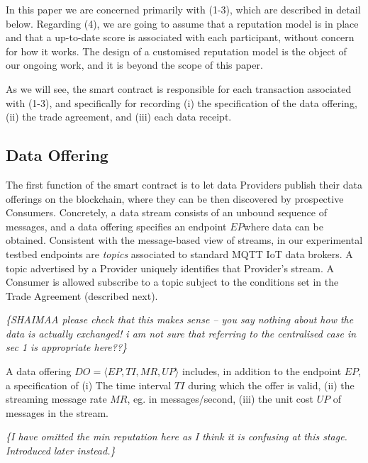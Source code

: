 \documentclass[letterpaper, 10 pt, conference]{ieeeconf}  %
\newcommand{\anote}[1]{{\leavevmode\smaller\itshape\color{red}\{#1\}}}
\newcommand{\ep}{\ensuremath{\mathit{EP}}}
\newcommand{\ti}{\ensuremath{\mathit{TI}}}
\newcommand{\mr}{\ensuremath{\mathit{MR}}}
\newcommand{\up}{\ensuremath{\mathit{UP}}}
\newcommand{\doff}{\ensuremath{\mathit{DO}}}
\begin{document}
In this paper we are concerned primarily with (1-3), which are described in detail below. Regarding (4), we are going to assume that a reputation model is in place and that a up-to-date score is associated with each participant, without concern for how it works. The design of a customised reputation model is the object of our ongoing work, and it is beyond the scope of this paper.

As we will see, the smart contract is responsible for each transaction associated with (1-3), and specifically for recording (i) the specification of the data offering, (ii) the trade agreement, and (iii) each data receipt.

\subsection{Data Offering}

The first function of the smart contract is to let data Providers publish their data offerings on the blockchain, where they can be then discovered by prospective Consumers. 
Concretely, a data stream consists of an unbound sequence of messages, and a data offering specifies an endpoint \ep where data can be obtained. Consistent with the message-based view of streams, in our experimental testbed endpoints are \textit{topics} associated to standard MQTT  IoT data brokers. A topic advertised by a Provider uniquely identifies that Provider's stream. A Consumer is allowed subscribe to a topic subject to the conditions set in the Trade Agreement (described next).

\anote{SHAIMAA please check that this makes sense -- you say nothing about how the data is actually exchanged! i am not sure that referring to the centralised case in sec 1 is appropriate here??}

A data offering $\doff = \langle \ep, \ti, \mr, \up \rangle$ includes, in addition to the endpoint \ep, a specification of (i) The time interval \ti{} during which the offer is valid, (ii) the streaming message rate \mr, eg. in messages/second, (iii) the unit cost \up{} of messages in the stream.

\anote{I have omitted the min reputation here as I think it is confusing at this stage. Introduced later instead.}


%
%
%
%
\end{document}
